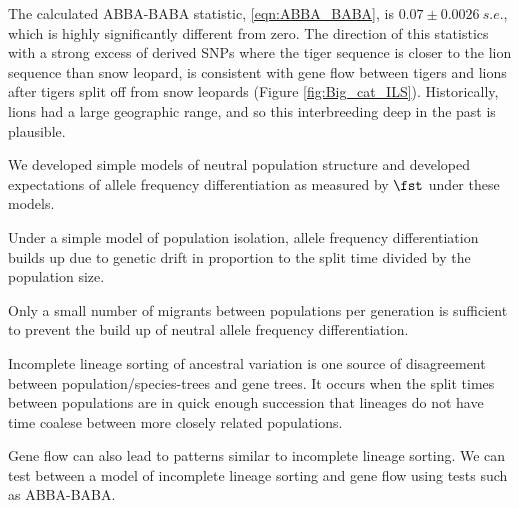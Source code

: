 The calculated ABBA-BABA
statistic, \eqn \eqref{eqn:ABBA_BABA}, is $0.07 \pm 0.0026~s.e.$,
which  is highly significantly different from zero.  The direction of
this statistics with a strong excess of derived SNPs where the tiger sequence is closer to
the lion sequence than snow leopard, is consistent with gene flow
between tigers and lions after tigers split off from snow
leopards (Figure \ref{fig:Big_cat_ILS}). Historically, lions had a large geographic range, and
so this interbreeding deep in the past is plausible.







\begin{ChapterSummary}
\item We developed simple models of neutral population structure and
  developed expectations of allele frequency differentiation as
  measured by $\fst$ under these models. 
\item Under a simple model of  population isolation, allele frequency
  differentiation builds up due to genetic drift in proportion to the
  split time divided by the population size.
  \item Only a small number of migrants between populations per generation is sufficient
    to prevent the build up of neutral allele frequency
    differentiation.
  \item Incomplete lineage sorting of ancestral variation is one source of disagreement
    between population/species-trees and gene trees. It occurs when the split times between
    populations are in quick enough succession that lineages do not
    have time coalese between more closely related populations. 
    \item Gene flow can also lead to patterns similar to incomplete
      lineage sorting. We can test between a model of incomplete
      lineage sorting and gene flow using tests such as ABBA-BABA.
\end{ChapterSummary}


